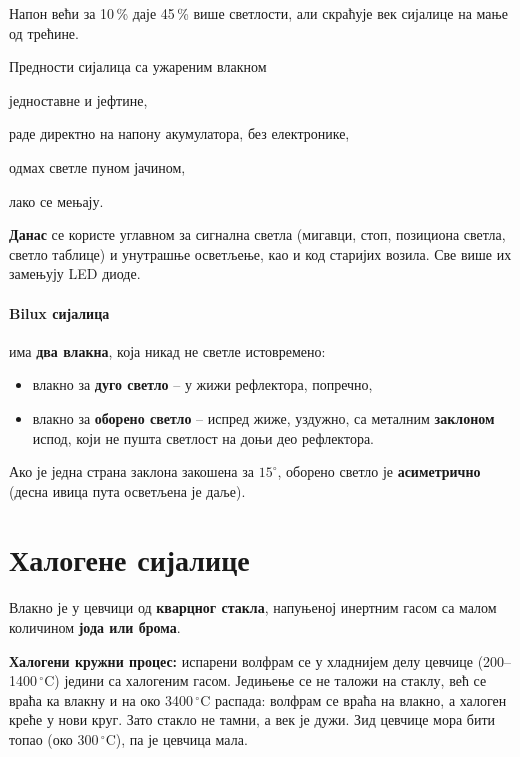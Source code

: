 \documentclass{report}
\begin{document}
\begin{kljucno}
Напон већи за 10\,\% даје 45\,\% више светлости, али скраћује век сијалице на
мање од трећине.
\end{kljucno}

\begin{podela}{Предности сијалица са ужареним влакном}
\begin{lista}
    \item једноставне и јефтине,
    \item раде директно на напону акумулатора, без електронике,
    \item одмах светле пуном јачином,
    \item лако се мењају.
\end{lista}
\end{podela}

\textbf{Данас} се користе углавном за сигнална светла (мигавци, стоп,
позициона светла, светло таблице) и унутрашње осветљење, као и код
старијих возила. Све више их замењују LED диоде.

\paragraph*{Bilux сијалица} има \textbf{два влакна}, која никад не светле
истовремено:
\begin{itemize}[noitemsep]
    \item влакно за \textbf{дуго светло} -- у жижи рефлектора, попречно,
    \item влакно за \textbf{оборено светло} -- испред жиже, уздужно, са
          металним \textbf{заклоном} испод, који не пушта светлост на доњи
          део рефлектора.
\end{itemize}
Ако је једна страна заклона закошена за $15^\circ$, оборено светло је
\textbf{асиметрично} (десна ивица пута осветљена је даље).

\section{Халогене сијалице}

Влакно је у цевчици од \textbf{кварцног стакла}, напуњеној инертним гасом са
малом количином \textbf{јода или брома}.

\textbf{Халогени кружни процес:} испарени волфрам се у хладнијем делу цевчице
(200--1400\,$^\circ$C) једини са халогеним гасом. Једињење се не таложи на
стаклу, већ се враћа ка влакну и на око 3400\,$^\circ$C распада: волфрам се
враћа на влакно, а халоген креће у нови круг. Зато стакло не тамни, а век је
дужи. Зид цевчице мора бити топао (око 300\,$^\circ$C), па је цевчица мала.
\end{document}

